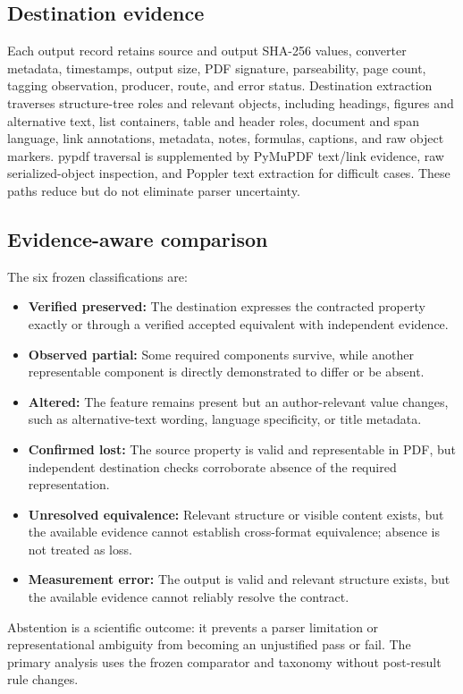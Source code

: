 \subsection{Destination evidence}
Each output record retains source and output SHA-256 values, converter metadata, timestamps, output size, PDF signature, parseability, page count, tagging observation, producer, route, and error status. Destination extraction traverses structure-tree roles and relevant objects, including headings, figures and alternative text, list containers, table and header roles, document and span language, link annotations, metadata, notes, formulas, captions, and raw object markers. pypdf traversal is supplemented by PyMuPDF text/link evidence, raw serialized-object inspection, and Poppler text extraction for difficult cases. These paths reduce but do not eliminate parser uncertainty.

\subsection{Evidence-aware comparison}
The six frozen classifications are:

\begin{itemize}
\item \textbf{Verified preserved:} The destination expresses the contracted property exactly or through a verified accepted equivalent with independent evidence.
\item \textbf{Observed partial:} Some required components survive, while another representable component is directly demonstrated to differ or be absent.
\item \textbf{Altered:} The feature remains present but an author-relevant value changes, such as alternative-text wording, language specificity, or title metadata.
\item \textbf{Confirmed lost:} The source property is valid and representable in PDF, but independent destination checks corroborate absence of the required representation.
\item \textbf{Unresolved equivalence:} Relevant structure or visible content exists, but the available evidence cannot establish cross-format equivalence; absence is not treated as loss.
\item \textbf{Measurement error:} The output is valid and relevant structure exists, but the available evidence cannot reliably resolve the contract.
\end{itemize}

Abstention is a scientific outcome: it prevents a parser limitation or representational ambiguity from becoming an unjustified pass or fail. The primary analysis uses the frozen comparator and taxonomy without post-result rule changes.
